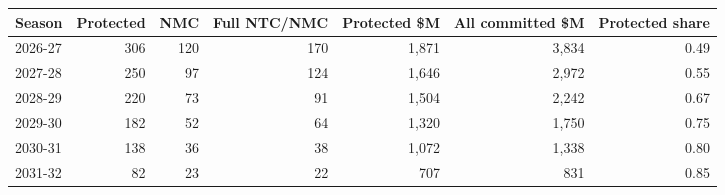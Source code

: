 \begin{tabular}{lrrrrrr}\toprule
Season & Protected & NMC & Full NTC/NMC & Protected \$M & All committed \$M & Protected share\\\midrule
2026-27 & 306 & 120 & 170 & 1,871 & 3,834 & 0.49\\
2027-28 & 250 & 97 & 124 & 1,646 & 2,972 & 0.55\\
2028-29 & 220 & 73 & 91 & 1,504 & 2,242 & 0.67\\
2029-30 & 182 & 52 & 64 & 1,320 & 1,750 & 0.75\\
2030-31 & 138 & 36 & 38 & 1,072 & 1,338 & 0.80\\
2031-32 & 82 & 23 & 22 & 707 & 831 & 0.85\\
\bottomrule\end{tabular}